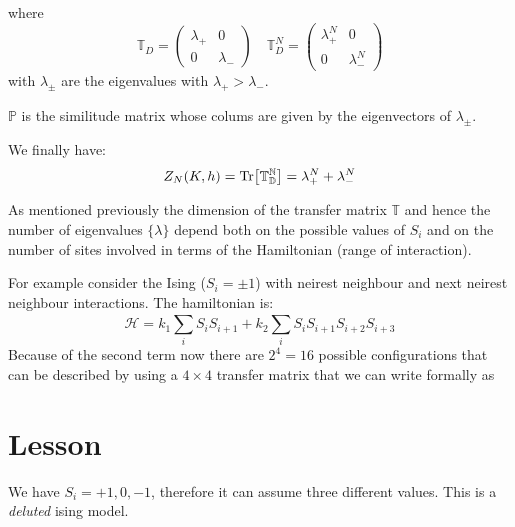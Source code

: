 \documentclass[../main/main.tex]{subfiles}
\begin{document}
where
\begin{equation}
\mathbb{T}_D =  \begin{pmatrix}
  \lambda _+   & 0 \\
  0   & \lambda _-
  \end{pmatrix}
  \quad
  \mathbb{T}_D^N =  \begin{pmatrix}
    \lambda _+^N   & 0 \\
    0   & \lambda _-^N
    \end{pmatrix}
\end{equation}
with \( \lambda _{\pm} \) are the eigenvalues with \( \lambda _+ > \lambda _- \).
\begin{remark}
\( \mathbb{P} \) is the similitude matrix whose colums are given by the eigenvectors of \(   \lambda _{\pm} \).
\end{remark}
We finally have:
\begin{equation}
  Z_N (K,h) = \Tr[\mathbb{T_D^N}] = \lambda _+^N  + \lambda _-^N
\end{equation}
\begin{remark}
As mentioned previously the dimension of the transfer matrix \( \mathbb{T} \) and hence the number of eigenvalues \( \{ \lambda  \}   \) depend both on the possible values of \( S_i \) and on the number of sites involved in terms of the Hamiltonian (range of interaction).
\end{remark}
\begin{example}
For example consider the Ising (\( S_i = \pm 1\)) with neirest neighbour and next neirest neighbour interactions. The hamiltonian is:
\begin{equation}
  \mathcal{H} = k_1 \sum_{i}^{} S_i S_{i+1} + k_2 \sum_{i}^{} S_i S_{i+1} S_{i+2} S_{i+3}
\end{equation}
Because of the second term now there are \( 2^4 = 16 \) possible configurations that can be described by using a \( 4 \times 4 \) transfer matrix that we can write formally as   
\end{example}





\section{Lesson}



We have \( S_i = +1,0,-1 \), therefore it can assume three different values.
This is a \emph{deluted} ising model.
\end{document}
